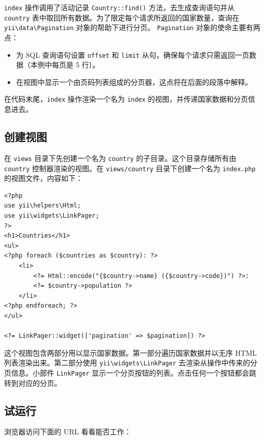 \lstinline|index| 操作调用了活动记录 \lstinline|Country::find()| 方法，去生成查询语句并从 \lstinline|country| 表中取回所有数据。为了限定每个请求所返回的国家数量，查询在 \texttt{yii{\allowbreak{}\textbackslash}data{\allowbreak{}\textbackslash}Pagination} 对象的帮助下进行分页。 \lstinline|Pagination| 对象的使命主要有两点：

\begin{itemize}
\item 为 SQL 查询语句设置 \lstinline|offset| 和 \lstinline|limit| 从句，确保每个请求只需返回一页数据（本例中每页是 5 行）。
\item 在视图中显示一个由页码列表组成的分页器，这点将在后面的段落中解释。
\end{itemize}
在代码末尾，\lstinline|index| 操作渲染一个名为 \lstinline|index| 的视图，并传递国家数据和分页信息进去。

\subsection{创建视图 \label{start-databases.md::creating-view}}
在 \lstinline|views| 目录下先创建一个名为 \lstinline|country| 的子目录。这个目录存储所有由 \lstinline|country| 控制器渲染的视图。在 \lstinline|views/country| 目录下创建一个名为 \lstinline|index.php| 的视图文件，内容如下：

\lstset{language=php}\begin{lstlisting}
<?php
use yii\helpers\Html;
use yii\widgets\LinkPager;
?>
<h1>Countries</h1>
<ul>
<?php foreach ($countries as $country): ?>
    <li>
        <?= Html::encode("{$country->name} ({$country->code})") ?>:
        <?= $country->population ?>
    </li>
<?php endforeach; ?>
</ul>

<?= LinkPager::widget(['pagination' => $pagination]) ?>
\end{lstlisting}
这个视图包含两部分用以显示国家数据。第一部分遍历国家数据并以无序 HTML 列表渲染出来。第二部分使用 \texttt{yii{\allowbreak{}\textbackslash}widgets{\allowbreak{}\textbackslash}LinkPager} 去渲染从操作中传来的分页信息。小部件 \lstinline|LinkPager| 显示一个分页按钮的列表。点击任何一个按钮都会跳转到对应的分页。

\subsection{试运行 \label{start-databases.md::trying-it-out}}
浏览器访问下面的 URL 看看能否工作：

